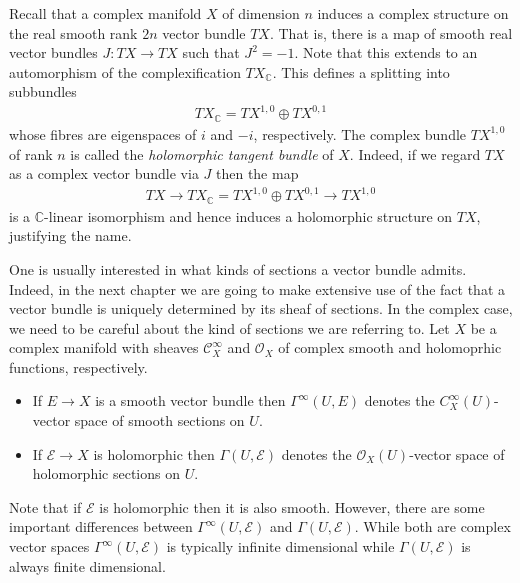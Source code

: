 \documentclass[12pt]{ociamthesis}  %
\begin{document}
\begin{example}
  Recall that a complex manifold $X$ of dimension $n$ induces a
  complex structure on the real smooth rank $2n$ vector bundle $TX$.
  That is, there is a map of smooth real vector bundles
  $J : TX \to TX$ such that $J^2 = -1$. Note that this extends to
  an automorphism of the complexification $TX_{\mathbb{C}}$.
  This defines a splitting into subbundles
  \begin{align}\label{eq:tangent_decomposition}
    TX_{\mathbb{C}}  = TX^{1,0} \oplus TX^{0,1}
  \end{align}
  whose fibres are eigenspaces of $i$ and $-i$, respectively. The
  complex bundle $TX^{1,0}$ of rank $n$ is called the
  \emph{holomorphic tangent bundle} of $X$. Indeed, if we regard $TX$
  as a complex vector bundle via $J$ then the map
  \begin{align}\label{eq:holomorphic_tangent_bundle}
    TX
    \longrightarrow TX_{\mathbb C}
    = TX^{1,0} \oplus TX^{0,1}
    \longrightarrow TX^{1,0}
  \end{align}
  is a $\mathbb{C}$-linear isomorphism and hence induces a holomorphic
  structure on $TX$, justifying the name.
\end{example}

One is usually interested in what kinds of sections a vector bundle
admits. Indeed, in the next chapter we are going to make extensive use
of the fact that a vector bundle is uniquely determined by its sheaf
of sections. In the complex case, we need to be careful about the
kind of sections we are referring to. Let $X$ be a complex manifold
with sheaves $\mathscr C^\infty_X$ and $\mathscr O_X$ of complex smooth
and holomoprhic functions, respectively.

\begin{itemize}
  \item If $E\to X$ is a smooth vector bundle then $\Gamma^\infty(U,E)$
        denotes the $C^\infty_X(U)$-vector space of smooth sections on $U$.
  \item If $\mathcal E\to X$ is holomorphic then $\Gamma(U,\mathcal E)$
        denotes the $\mathscr O_X(U)$-vector space of holomorphic sections
        on $U$.
\end{itemize}

Note that if $\mathcal E$ is holomorphic then it is also smooth.
However, there are some important differences between
$\Gamma^\infty(U,\mathcal E)$ and $\Gamma(U,\mathcal E)$. While both are
complex vector spaces $\Gamma^\infty(U,\mathcal E)$ is typically infinite
dimensional while $\Gamma(U,\mathcal E)$ is always finite
dimensional.~\cite[Theorem 1.4.1]{ma2007}
\end{document}
